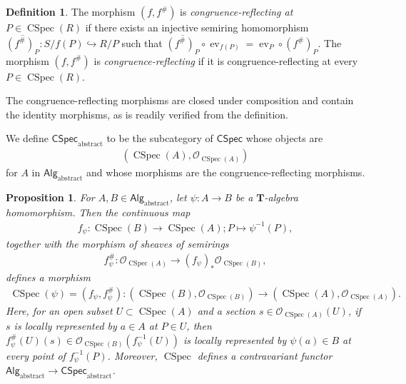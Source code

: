 \documentclass[a4paper,12pt]{amsart}
\theoremstyle{plain}
\newtheorem{proposition}[theorem]{Proposition}
\theoremstyle{definition}
\newtheorem{definition}[theorem]{Definition}
\begin{document}
\begin{definition}
    \label{dfn2}
The morphism $(f, f^\#)$ is \textit{congruence-reflecting at $P \in \operatorname{CSpec}(R)$} if there exists an injective semiring homomorphism $\overline{(f^{\#})_P} : S / f(P) \hookrightarrow R / P$ such that $\overline{(f^{\#})_P} \circ \operatorname{ev}_{f(P)} =\operatorname{ev}_P \circ (f^{\#})_P$.
The morphism $(f, f^\#)$ is \textit{congruence-reflecting} if it is congruence-reflecting at every $P \in \operatorname{CSpec}(R)$.
\end{definition}

The congruence-reflecting morphisms are closed under composition and contain the identity morphisms, as is readily verified from the definition.

We define $\mathsf{CSpec}_{\mathrm{abstract}}$ to be the subcategory of $\mathsf{CSpec}$ whose objects are
\begin{align*}
\left( \operatorname{CSpec}(A),\mathcal{O}_{\operatorname{CSpec}(A)} \right)
\end{align*}
for $A$ in $\mathsf{Alg}_{\mathrm{abstract}}$ and whose morphisms are the congruence-reflecting morphisms.

\begin{proposition}
    \label{prop2}
For $A, B \in \mathsf{Alg}_{\mathrm{abstract}}$, let $\psi : A \to B$ be a $\boldsymbol{T}$-algebra homomorphism.
Then the continuous map
\begin{align*}
f_\psi : \operatorname{CSpec}(B) \to \operatorname{CSpec}(A); P \mapsto \psi^{-1}(P),
\end{align*}
together with the morphism of sheaves of semirings
\begin{align*}
f^{\#}_\psi :
\mathcal{O}_{\operatorname{CSpec}(A)}
\to
(f_{\psi})_{\ast}\mathcal{O}_{\operatorname{CSpec}(B)},
\end{align*}
defines a morphism
\begin{align*}
\operatorname{CSpec}(\psi) = (f_{\psi}, f^{\#}_{\psi}):
\left(\operatorname{CSpec}(B),\mathcal{O}_{\operatorname{CSpec}(B)}\right)
\to
\left(\operatorname{CSpec}(A),\mathcal{O}_{\operatorname{CSpec}(A)}\right).
\end{align*}
Here, for an open subset $U\subset\operatorname{CSpec}(A)$ and a section $s \in \mathcal{O}_{\operatorname{CSpec}(A)}(U)$, if $s$ is locally represented by $a\in A$ at $P \in U$, then $f^{\#}_{\psi}(U)(s) \in \mathcal{O}_{\operatorname{CSpec}(B)}(f_{\psi}^{-1}(U))$ is locally represented by $\psi(a)\in B$ at every point of $f_{\psi}^{-1}(P)$.
Moreover, $\operatorname{CSpec}$ defines a contravariant functor $\mathsf{Alg}_{\mathrm{abstract}} \to \mathsf{CSpec}_{\mathrm{abstract}}$.
\end{proposition}
\end{document}
